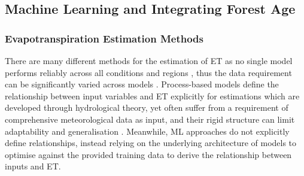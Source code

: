 \subsection{Machine Learning and Integrating Forest Age}
\subsubsection{Evapotranspiration Estimation Methods}
There are many different methods for the estimation of ET as no single model performs reliably across all conditions and regions \parencite{derardja2024advancements}, thus the data requirement can be significantly varied across models \parencite{zhao2013evapotranspiration}. Process-based models define the relationship between input variables and ET explicitly for estimations which are developed through hydrological theory, yet often suffer from a requirement of comprehensive meteorological data as input, and their rigid structure can limit adaptability and generalisation \parencite{amani2023review}. Meanwhile, ML approaches do not explicitly define relationships, instead relying on the underlying architecture of models to optimise against the provided training data  to derive the relationship between inputs and ET. 


